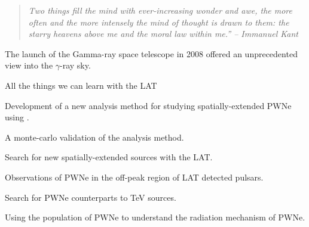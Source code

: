 
\begin{quote}
\em{Two things fill the mind with ever-increasing wonder and awe,
the more often and the more intensely the mind of thought is drawn to
them: the starry heavens above me and the moral law within me.'' -- Immanuel Kant}
\end{quote}

The launch of the \fermi Gamma-ray space telescope in 2008 offered
an unprecedented view into the $\gamma$-ray sky.

All the things we can learn with the LAT

Development of a new analysis method for studying spatially-extended PWNe
using \pointlike.

A monte-carlo validation of the analysis method.

Search for new spatially-extended sources with the LAT.

Observations of PWNe in the off-peak region of LAT detected pulsars.

Search for PWNe counterparts to TeV sources.

Using the population of PWNe to understand the radiation mechanism of PWNe.
